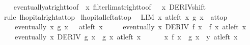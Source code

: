 \begin{isabellebody}
%
\isadelimproof
\ \ %
\endisadelimproof
%
\isatagproof
{}\isamarkupfalse%
\ eventually{\isacharunderscore}{\kern0pt}at{\isacharunderscore}{\kern0pt}right{\isacharunderscore}{\kern0pt}to{\isacharunderscore}{\kern0pt}{}{\isacharbrackleft}{\kern0pt}of\ {\isacharunderscore}{\kern0pt}\ x{\isacharbrackright}{\kern0pt}\ filterlim{\isacharunderscore}{\kern0pt}at{\isacharunderscore}{\kern0pt}right{\isacharunderscore}{\kern0pt}to{\isacharunderscore}{\kern0pt}{}{\isacharbrackleft}{\kern0pt}of\ {\isacharunderscore}{\kern0pt}\ {\isacharunderscore}{\kern0pt}\ x{\isacharbrackright}{\kern0pt}\ DERIV{\isacharunderscore}{\kern0pt}shift\isanewline
\ \ \isamarkupfalse%
\ {\isacharparenleft}{\kern0pt}rule\ lhopital{\isacharunderscore}{\kern0pt}right{\isacharunderscore}{\kern0pt}{}{\isacharunderscore}{\kern0pt}at{\isacharunderscore}{\kern0pt}top{\isacharparenright}{\kern0pt}%
\endisatagproof
{\isafoldproof}%
%
\isadelimproof
\isanewline
%
\endisadelimproof
\isanewline
{}\isamarkupfalse%
\ lhopital{\isacharunderscore}{\kern0pt}left{\isacharunderscore}{\kern0pt}at{\isacharunderscore}{\kern0pt}top{\isacharcolon}{\kern0pt}\isanewline
\ \ {\isachardoublequoteopen}LIM\ x\ at{\isacharunderscore}{\kern0pt}left\ x{\isachardot}{\kern0pt}\ g\ x\ {\isacharcolon}{\kern0pt}{\isachargreater}{\kern0pt}\ at{\isacharunderscore}{\kern0pt}top\ {\isasymLongrightarrow}\isanewline
\ \ \ \ eventually\ {\isacharparenleft}{\kern0pt}{\isasymlambda}x{\isachardot}{\kern0pt}\ g{\isacharprime}{\kern0pt}\ x\ {\isasymnoteq}\ {}{\isacharparenright}{\kern0pt}\ {\isacharparenleft}{\kern0pt}at{\isacharunderscore}{\kern0pt}left\ x{\isacharparenright}{\kern0pt}\ {\isasymLongrightarrow}\isanewline
\ \ \ \ eventually\ {\isacharparenleft}{\kern0pt}{\isasymlambda}x{\isachardot}{\kern0pt}\ DERIV\ f\ x\ {\isacharcolon}{\kern0pt}{\isachargreater}{\kern0pt}\ f{\isacharprime}{\kern0pt}\ x{\isacharparenright}{\kern0pt}\ {\isacharparenleft}{\kern0pt}at{\isacharunderscore}{\kern0pt}left\ x{\isacharparenright}{\kern0pt}\ {\isasymLongrightarrow}\isanewline
\ \ \ \ eventually\ {\isacharparenleft}{\kern0pt}{\isasymlambda}x{\isachardot}{\kern0pt}\ DERIV\ g\ x\ {\isacharcolon}{\kern0pt}{\isachargreater}{\kern0pt}\ g{\isacharprime}{\kern0pt}\ x{\isacharparenright}{\kern0pt}\ {\isacharparenleft}{\kern0pt}at{\isacharunderscore}{\kern0pt}left\ x{\isacharparenright}{\kern0pt}\ {\isasymLongrightarrow}\isanewline
\ \ \ \ {\isacharparenleft}{\kern0pt}{\isacharparenleft}{\kern0pt}{\isasymlambda}\ x{\isachardot}{\kern0pt}\ {\isacharparenleft}{\kern0pt}f{\isacharprime}{\kern0pt}\ x\ {\isacharslash}{\kern0pt}\ g{\isacharprime}{\kern0pt}\ x{\isacharparenright}{\kern0pt}{\isacharparenright}{\kern0pt}\ {\isasymlonglongrightarrow}\ y{\isacharparenright}{\kern0pt}\ {\isacharparenleft}{\kern0pt}at{\isacharunderscore}{\kern0pt}left\ x{\isacharparenright}{\kern0pt}\ {\isasymLongrightarrow}\isanewline

\end{isabellebody}
